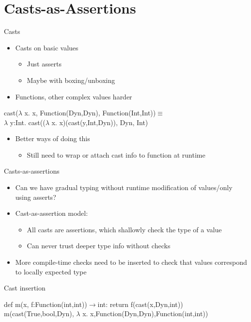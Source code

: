 \documentclass[mathserif]{beamer}
\begin{document}
\section{Casts-as-Assertions}
\begin{frame}{Casts}
  \begin{itemize}
  \item Casts on basic values
    \begin{itemize}
    \item Just asserts
    \item Maybe with boxing/unboxing
    \end{itemize}
  \item Functions, other complex values harder
  \end{itemize}
  \begin{center}
    cast($\lambda$ x. x, Function(Dyn,Dyn), Function(Int,Int))$\equiv$\\
    $\lambda$ y:Int. cast(($\lambda$ x. x)(cast(y,Int,Dyn)), Dyn, Int)
  \end{center}
  \begin{itemize}
  \item Better ways of doing this
    \begin{itemize}
    \item Still need to wrap or attach cast info to function at runtime 
    \end{itemize}
  \end{itemize}
\end{frame}

\begin{frame}{Casts-as-assertions}
  \begin{itemize}
  \item Can we have gradual typing without runtime modification of values/only using asserts?
  \item Cast-as-assertion model:
    \begin{itemize}
    \item All casts are assertions, which shallowly check the type of a value
    \item Can never trust deeper type info without checks
    \end{itemize}
  \item More compile-time checks need to be inserted to check that values correspond to locally expected type
  \end{itemize}
\end{frame}

\begin{frame}{Cast insertion}
 \begin{algorithmic}[2]
    \State def m(x, f:Function(int,int))$\to$int:
    \State \;\;\;return f({\color{blue}cast(}x{\color{blue},Dyn,int)})
    \State 
    \State m({\color{blue}cast(}True{\color{blue},bool,Dyn)}, 
    \State \;$\lambda$ x. x{\color{blue},Function(Dyn,Dyn),Function(int,int)})
  \end{algorithmic}
\end{frame}
\end{document}
